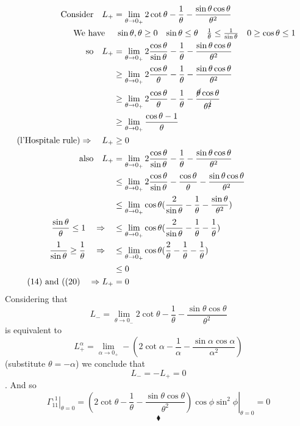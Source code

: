 \begin{align}
\text{Consider}\quad L_{+}& = \lim_{\theta \to 0_{+}}2\cot\theta -\frac{1}{\theta}-\frac{\sin\theta\cos\theta}{\theta^2} \\
\text{We have}\quad &\begin{array}{lllll}
\sin\theta , \theta \ge 0&\sin\theta \leq \theta&\frac{1}{\theta}\leq \frac{1}{\sin \theta}& 0 \ge \cos \theta \leq 1\end{array}\\
\text{so} \quad L_{+}&= \lim_{\theta \to 0_{+}}2\frac{\cos\theta}{\sin\theta} -\frac{1}{\theta}-\frac{\sin\theta\cos\theta}{\theta^2} \\
\ &\geq \lim_{\theta \to 0_{+}}2\frac{\cos\theta}{\theta} -\frac{1}{\theta}-\frac{\sin\theta\cos\theta}{\theta^2} \\
\ &\geq \lim_{\theta \to 0_{+}}2\frac{\cos\theta}{\theta} -\frac{1}{\theta}-\frac{\cancel{\theta}\cos\theta}{\theta^{\cancel{2} }}\\
\ &\geq \lim_{\theta \to 0_{+}}\frac{\cos\theta-1}{\theta}\\
\text{(l'Hospitale rule)}\Rightarrow\quad L_{+}&\geq 0\\
\text{also} \quad L_{+}&= \lim_{\theta \to 0_{+}}2\frac{\cos\theta}{\sin\theta} -\frac{1}{\theta}-\frac{\sin\theta\cos\theta}{\theta^2} \\
\ &\leq \lim_{\theta \to 0_{+}}2\frac{\cos\theta}{\sin\theta} -\frac{\cos\theta}{\theta}-\frac{\sin\theta\cos\theta}{\theta^2} \\
\ &\leq \lim_{\theta \to 0_{+}}\cos\theta(\frac{2}{\sin\theta} -\frac{1}{\theta}-\frac{\sin\theta}{\theta^2})\\
\frac{\sin\theta}{\theta} \leq 1 \quad\Rightarrow\quad &\leq\lim_{\theta \to 0_{+}} \cos\theta(\frac{2}{\sin\theta} -\frac{1}{\theta}-\frac{1}{\theta})\\
\frac{1}{\sin\theta} \geq \frac{1}{\theta} \quad\Rightarrow\quad &\leq\lim_{\theta \to 0_{+}} \cos\theta(\frac{2}{\theta} -\frac{1}{\theta}-\frac{1}{\theta})\\
\ & \leq 0\\
\text{(14) and ((20)}\quad \Rightarrow L_{+}& =0
\end{align} 
Considering that $$L_{-} = \lim_{\theta \to 0_{-}}2\cot\theta -\frac{1}{\theta}-\frac{\sin\theta\cos\theta}{\theta^2}$$ is equivalent to  $$L_{+}^{\alpha} = \lim_{\alpha \to 0_{+}}-(2\cot\alpha -\frac{1}{\alpha}-\frac{\sin\alpha\cos\alpha}{\alpha^2})$$ (substitute $\theta = -\alpha$) we conclude that   $$L_{-} =  -L_{+}=0$$. And so $$\left.\Gamma_{11}^{,1}\right|_{\theta=0} =\left.(2\cot\theta -\frac{1}{\theta}-\frac{\sin\theta\cos\theta}{\theta^2})\cos\phi\sin^2\phi\right|_{\theta=0} = 0$$
$$\blacklozenge$$
\newpage

